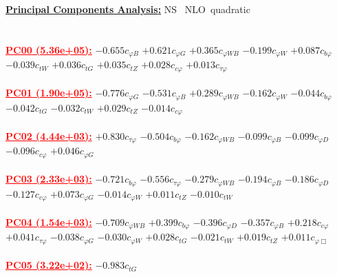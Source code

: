\documentclass{article}
\begin{document}
\noindent \underline{\bf{Principal Components Analysis}:} \rm NS \ NLO\ quadratic\\ \\ \\
\noindent \textcolor{red}{\underline{\bf{PC00} (5.36e+05):}}
{$-0.655$}{\rm $c_{\varphi B}$}
{$+0.621$}{\rm $c_{\varphi G}$}
{$+0.365$}{\rm $c_{\varphi WB}$}
{$-0.199$}{\rm $c_{\varphi W}$}
{$+0.087$}{\rm $c_{b \varphi}$}
{$-0.039$}{\rm $c_{tW}$}
{$+0.036$}{\rm $c_{tG}$}
{$+0.035$}{\rm $c_{tZ}$}
{$+0.028$}{\rm $c_{c \varphi}$}
{$+0.013$}{\rm $c_{\tau \varphi}$}
 \nonumber \\ \nonumber \\
\noindent \textcolor{red}{\underline{\bf{PC01} (1.90e+05):}}
{$-0.776$}{\rm $c_{\varphi G}$}
{$-0.531$}{\rm $c_{\varphi B}$}
{$+0.289$}{\rm $c_{\varphi WB}$}
{$-0.162$}{\rm $c_{\varphi W}$}
{$-0.044$}{\rm $c_{b \varphi}$}
{$-0.042$}{\rm $c_{tG}$}
{$-0.032$}{\rm $c_{tW}$}
{$+0.029$}{\rm $c_{tZ}$}
{$-0.014$}{\rm $c_{c \varphi}$}
 \nonumber \\ \nonumber \\
\noindent \textcolor{red}{\underline{\bf{PC02} (4.44e+03):}}
{$+0.830$}{\rm $c_{\tau \varphi}$}
{$-0.504$}{\rm $c_{b \varphi}$}
{$-0.162$}{\rm $c_{\varphi WB}$}
{$-0.099$}{\rm $c_{\varphi B}$}
{$-0.099$}{\rm $c_{\varphi D}$}
{$-0.096$}{\rm $c_{c \varphi}$}
{$+0.046$}{\rm $c_{\varphi G}$}
 \nonumber \\ \nonumber \\
\noindent \textcolor{red}{\underline{\bf{PC03} (2.33e+03):}}
{$-0.721$}{\rm $c_{b \varphi}$}
{$-0.556$}{\rm $c_{\tau \varphi}$}
{$-0.279$}{\rm $c_{\varphi WB}$}
{$-0.194$}{\rm $c_{\varphi B}$}
{$-0.186$}{\rm $c_{\varphi D}$}
{$-0.127$}{\rm $c_{c \varphi}$}
{$+0.073$}{\rm $c_{\varphi G}$}
{$-0.014$}{\rm $c_{\varphi W}$}
{$+0.011$}{\rm $c_{tZ}$}
{$-0.010$}{\rm $c_{tW}$}
 \nonumber \\ \nonumber \\
\noindent \textcolor{red}{\underline{\bf{PC04} (1.54e+03):}}
{$-0.709$}{\rm $c_{\varphi WB}$}
{$+0.399$}{\rm $c_{b \varphi}$}
{$-0.396$}{\rm $c_{\varphi D}$}
{$-0.357$}{\rm $c_{\varphi B}$}
{$+0.218$}{\rm $c_{c \varphi}$}
{$+0.041$}{\rm $c_{\tau \varphi}$}
{$-0.038$}{\rm $c_{\varphi G}$}
{$-0.030$}{\rm $c_{\varphi W}$}
{$+0.028$}{\rm $c_{tG}$}
{$-0.021$}{\rm $c_{tW}$}
{$+0.019$}{\rm $c_{tZ}$}
{$+0.011$}{\rm $c_{\varphi \Box}$}
 \nonumber \\ \nonumber \\
\noindent \textcolor{red}{\underline{\bf{PC05} (3.22e+02):}}
{$-0.983$}{\rm $c_{tG}$}
\end{document}
